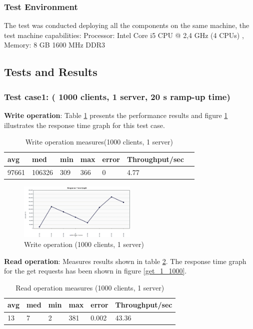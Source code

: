 \documentclass{sig-alternate}
\begin{document}
\subsubsection{Test Environment}			
The test was conducted deploying all the components on the same machine, the test machine capabilities: Processor: Intel Core i5 CPU @ 2,4 GHz (4 CPUs) , Memory: 8 GB 1600 MHz DDR3

\subsection{Tests and Results}
\subsubsection{Test case1: ( 1000 clients, 1 server, 20 s ramp-up time)}
\textbf{Write operation}:  Table \ref{put_1_1000_tbl} presents the performance results and figure \ref{put_1_1000} illustrates the response time graph for this  test case.
\begin{table}[h]
\begin{tabular}{|l|l|l|l|l|l|l|}
\hline
 \textbf{avg} & \textbf{med} & \textbf{min} & \textbf{max} & \textbf{error} & \textbf{Throughput/sec} \\ \hline
 97661 & 106326 & 309 & 366 & 0 & 4.77 \\ \hline
\end{tabular}\caption{Write operation measures(1000 clients, 1 server)}\label{put_1_1000_tbl}
\end{table}
\begin{center}
\begin{figure}[ht!]
     \includegraphics[width=0.5\textwidth]{put_1_1000_response.png}
\caption{Write operation (1000 clients, 1 server) \label{put_1_1000}}
\end{figure}
\end{center}
\textbf{Read operation}: Measures results shown in table \ref{get_1_1000_tbl}. The response time graph for the get requests has been shown in figure \ref{get_1_1000}.
\begin{table}[h]
\begin{tabular}{|l|l|l|l|l|l|}
\hline
\textbf{avg} & \textbf{med} & \textbf{min} & \textbf{max} & \textbf{error} & \textbf{Throughput/sec} \\ \hline
13 & 7 & 2 & 381 & 0.002 & 43.36 \\ \hline
\end{tabular}\caption{Read operation measures (1000 clients, 1 server)}\label{get_1_1000_tbl}
\end{table}
\end{document}
